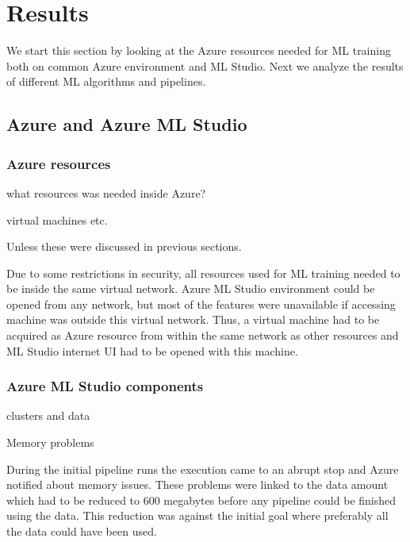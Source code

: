 

\section{Results}\label{sec:results}

We start this section by looking at
the Azure resources needed for ML training
both on common Azure environment and ML Studio.
Next we analyze the results of
different ML algorithms and pipelines.

\subsection{Azure and Azure ML Studio}\label{subsec:azure-and-azure-ml-studio}

\subsubsection*{Azure resources}
\begin{itcomment}
    what resources was needed inside Azure?

    virtual machines etc.

    Unless these were discussed in previous sections.
\end{itcomment}


Due to some restrictions in security,
all resources used for ML training
needed to be inside the same virtual network.
Azure ML Studio environment could be opened from any network,
but most of the features were unavailable
if accessing machine was outside this virtual network.
Thus,
a virtual machine had to be acquired as Azure resource
from within the same network as other resources
and ML Studio internet UI had to be opened with this machine.


\subsubsection*{Azure ML Studio components}
\begin{itcomment}
    clusters and data

    Memory problems
\end{itcomment}

During the initial pipeline runs
the execution came to an abrupt stop
and Azure notified about memory issues.
These problems were linked to the data amount
which had to be reduced to 600 megabytes
before any pipeline could be finished using the data.
This reduction was against the initial goal
where preferably all the data could have been used.

